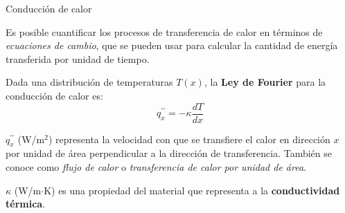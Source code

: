 \documentclass{beamer}
\begin{document}
\begin{frame}{Conducción de calor \cite{Bergman}}

{\small 
Es posible cuantificar los procesos de transferencia de calor en términos de \textit{ecuaciones de cambio},
que se pueden usar para calcular la cantidad de energía transferida por unidad de tiempo.

\strut

Dada una distribución de temperaturas $T(x)$, la \textbf{Ley de Fourier} para la conducción de calor es:
%
\[
\boxed{q_x^{\prime\prime} = -\kappa \frac{d T}{d x}}
\]

\strut

$q_x^{\prime\prime}$ (W/m$^2$) representa la velocidad con que se transfiere el calor en dirección $x$ por unidad de área perpendicular a la dirección
de transferencia. También se conoce como \textit{flujo de calor} o \textit{transferencia de calor por unidad de área}.

\strut
		
$\kappa$ (W/m$\cdot$K) es una propiedad del material que representa a la \textbf{conductividad térmica}.
}

\end{frame}
\end{document}
